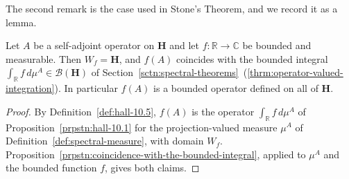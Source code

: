 The second remark is the case used in Stone's Theorem, and we record it as a lemma.

\begin{lemma}
    \label{lmm:functional-calculus-bounded}
    \leanok
    Let $A$ be a self-adjoint operator on $\mathbf{H}$ and let $f : \mathbb{R} \to \mathbb{C}$ be bounded and measurable. Then $W_f = \mathbf{H}$, and $f(A)$ coincides with the bounded integral $\int_{\mathbb{R}} f \, d\mu^A \in \mathcal{B}(\mathbf{H})$ of Section~\ref{sctn:spectral-theorems}~(\ref{thrm:operator-valued-integration}). In particular $f(A)$ is a bounded operator defined on all of $\mathbf{H}$.
\end{lemma}
\begin{proof}
    \leanok
By Definition~\ref{def:hall-10.5}, $f(A)$ is the operator $\int_{\mathbb{R}} f \, d\mu^A$ of Proposition~\ref{prpstn:hall-10.1} for the projection-valued measure $\mu^A$ of Definition~\ref{def:spectral-measure}, with domain $W_f$. Proposition~\ref{prpstn:coincidence-with-the-bounded-integral}, applied to $\mu^A$ and the bounded function $f$, gives both claims.
\end{proof}


